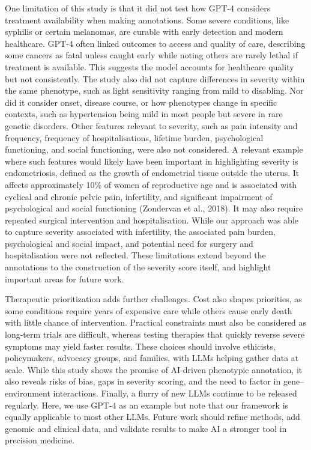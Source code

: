 \documentclass[
]{agujournal2019}
\begin{document}
One limitation of this study is that it did not test how GPT-4 considers
treatment availability when making annotations. Some severe conditions,
like syphilis or certain melanomas, are curable with early detection and
modern healthcare. GPT-4 often linked outcomes to access and quality of
care, describing some cancers as fatal unless caught early while noting
others are rarely lethal if treatment is available. This suggests the
model accounts for healthcare quality but not consistently. The study
also did not capture differences in severity within the same phenotype,
such as light sensitivity ranging from mild to disabling. Nor did it
consider onset, disease course, or how phenotypes change in specific
contexts, such as hypertension being mild in most people but severe in
rare genetic disorders. Other features relevant to severity, such as
pain intensity and frequency, frequency of hospitalisations, lifetime
burden, psychological functioning, and social functioning, were also not
considered. A relevant example where such features would likely have
been important in highlighting severity is endometriosis, defined as the
growth of endometrial tissue outside the uterus. It affects
approximately 10\% of women of reproductive age and is associated with
cyclical and chronic pelvic pain, infertility, and significant
impairment of psychological and social functioning (Zondervan et al.,
2018). It may also require repeated surgical intervention and
hospitalisation. While our approach was able to capture severity
associated with infertility, the associated pain burden, psychological
and social impact, and potential need for surgery and hospitalisation
were not reflected. These limitations extend beyond the annotations to
the construction of the severity score itself, and highlight important
areas for future work.

Therapeutic prioritization adds further challenges. Cost also shapes
priorities, as some conditions require years of expensive care while
others cause early death with little chance of intervention. Practical
constraints must also be considered as long-term trials are difficult,
whereas testing therapies that quickly reverse severe symptoms may yield
faster results. These choices should involve ethicists, policymakers,
advocacy groups, and families, with LLMs helping gather data at scale.
While this study shows the promise of AI-driven phenotypic annotation,
it also reveals risks of bias, gaps in severity scoring, and the need to
factor in gene--environment interactions. Finally, a flurry of new LLMs
continue to be released regularly. Here, we use GPT-4 as an example but
note that our framework is equally applicable to most other LLMs. Future
work should refine methods, add genomic and clinical data, and validate
results to make AI a stronger tool in precision medicine.
\end{document}
